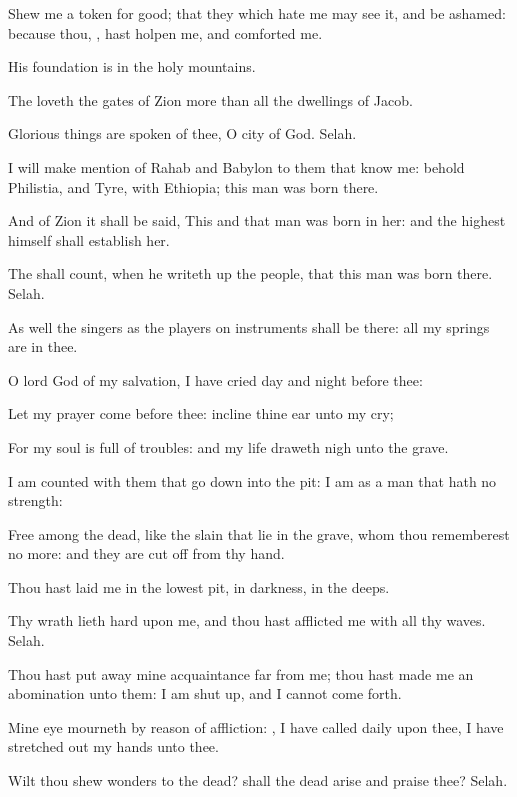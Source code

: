 \Verse Shew me a token for good; that they which hate me may see it, and be ashamed: because thou, \LORD, hast holpen me, and comforted me.




\Chapter
\Verse His foundation is in the holy mountains.

\Verse The \LORD loveth the gates of Zion more than all the dwellings of Jacob.

\Verse Glorious things are spoken of thee, O city of God. Selah.

\Verse I will make mention of Rahab and Babylon to them that know me: behold Philistia, and Tyre, with Ethiopia; this man was born there.

\Verse And of Zion it shall be said, This and that man was born in her: and the highest himself shall establish her.

\Verse The \LORD shall count, when he writeth up the people, that this man was born there. Selah.

\Verse As well the singers as the players on instruments shall be there: all my springs are in thee.




\Chapter
\Verse O lord God of my salvation, I have cried day and night before thee:

\Verse Let my prayer come before thee: incline thine ear unto my cry;

\Verse For my soul is full of troubles: and my life draweth nigh unto the grave.

\Verse I am counted with them that go down into the pit: I am as a man that hath no strength:

\Verse Free among the dead, like the slain that lie in the grave, whom thou rememberest no more: and they are cut off from thy hand.

\Verse Thou hast laid me in the lowest pit, in darkness, in the deeps.

\Verse Thy wrath lieth hard upon me, and thou hast afflicted me with all thy waves. Selah.

\Verse Thou hast put away mine acquaintance far from me; thou hast made me an abomination unto them: I am shut up, and I cannot come forth.

\Verse Mine eye mourneth by reason of affliction: \LORD, I have called daily upon thee, I have stretched out my hands unto thee.

\Verse Wilt thou shew wonders to the dead? shall the dead arise and praise thee? Selah.

